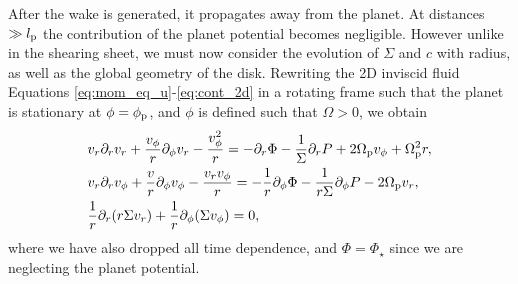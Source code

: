 After the wake is generated, it propagates away from the planet.
At distances $\gg l_{\rm p}$ the contribution of the planet potential becomes negligible.
However unlike in the shearing sheet, we must now consider the evolution of $\Sigma$ and $c$ with radius, as well as the global geometry of the disk.
Rewriting the 2D inviscid fluid Equations \eqref{eq:mom_eq_u}-\eqref{eq:cont_2d} in a rotating frame such that the planet is stationary at $\phi=\phi_{\rm p}$, and $\phi$ is defined such that $\Omega>0$, we obtain \citep{landau1987}
\begin{align}
    &v_r \partial_r v_r + \frac{v_\phi}{r} \partial_\phi v_r - \frac{v_\phi^2}{r} = - \partial_r \Phi - \frac{1}{\Sigma} \partial_r P + 2 \Omega_{\rm p} v_\phi + \Omega_{\rm p}^2 r, \label{eq:mom_eq_u_pl} \\ 
    &v_r \partial_r v_\phi + \frac{v}{r} \partial_\phi v_\phi - \frac{v_r v_\phi}{r} = - \frac{1}{r} \partial_\phi \Phi - \frac{1}{r\Sigma} \partial_\phi P - 2 \Omega_{\rm p} v_r, \label{eq:mom_eq_v_pl} \\
    &\frac{1}{r} \partial_r (r \Sigma v_r) + \frac{1}{r} \partial_\phi (\Sigma v_\phi) = 0,
    \label{eq:cont_2d_pl}
\end{align}
where we have also dropped all time dependence, and $\Phi=\Phi_\star$ since we are neglecting the planet potential.

